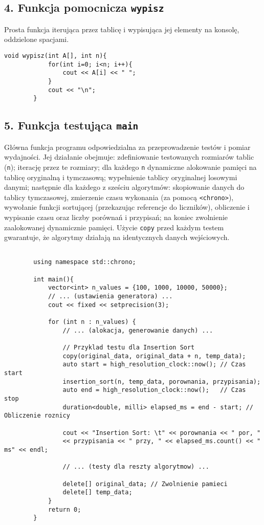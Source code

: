\documentclass[12pt, a4paper]{article} %
\begin{document}
	\newpage
	\subsection*{4. Funkcja pomocnicza \texttt{wypisz}}
	Prosta funkcja iterująca przez tablicę i wypisująca jej elementy na konsolę, oddzielone spacjami.
	
	\begin{lstlisting}[caption={Funkcja wypisz}, label={lst:wypisz}]
		void wypisz(int A[], int n){
			for(int i=0; i<n; i++){
				cout << A[i] << " ";
			}
			cout << "\n";
		}
	\end{lstlisting}
	
	\newpage
	\subsection*{5. Funkcja testująca \texttt{main}}
	Główna funkcja programu odpowiedzialna za przeprowadzenie testów i pomiar wydajności. Jej działanie obejmuje: zdefiniowanie testowanych rozmiarów tablic (\texttt{n}); iterację przez te rozmiary; dla każdego \texttt{n} dynamiczne alokowanie pamięci na tablicę oryginalną i tymczasową; wypełnienie tablicy oryginalnej losowymi danymi; następnie dla każdego z sześciu algorytmów: skopiowanie danych do tablicy tymczasowej, zmierzenie czasu wykonania (za pomocą \texttt{<chrono>}), wywołanie funkcji sortującej (przekazując referencje do liczników), obliczenie i wypisanie czasu oraz liczby porównań i przypisań; na koniec zwolnienie zaalokowanej dynamicznie pamięci. Użycie \texttt{copy} przed każdym testem gwarantuje, że algorytmy działają na identycznych danych wejściowych.
	
	\begin{lstlisting}[caption={Fragment funkcji main - testowanie i pomiar czasu}, label={lst:maintest}]
	
		using namespace std::chrono;
		
		int main(){
			vector<int> n_values = {100, 1000, 10000, 50000};
			// ... (ustawienia generatora) ...
			cout << fixed << setprecision(3);
			
			for (int n : n_values) {
				// ... (alokacja, generowanie danych) ...
				
				// Przyklad testu dla Insertion Sort
				copy(original_data, original_data + n, temp_data);
				auto start = high_resolution_clock::now(); // Czas start
				insertion_sort(n, temp_data, porownania, przypisania);
				auto end = high_resolution_clock::now();   // Czas stop
				duration<double, milli> elapsed_ms = end - start; // Obliczenie roznicy
				
				cout << "Insertion Sort: \t" << porownania << " por, "
				<< przypisania << " przy, " << elapsed_ms.count() << " ms" << endl;
				
				// ... (testy dla reszty algorytmow) ...
				
				delete[] original_data; // Zwolnienie pamieci
				delete[] temp_data;
			}
			return 0;
		}
	\end{lstlisting}
	
\end{document}
